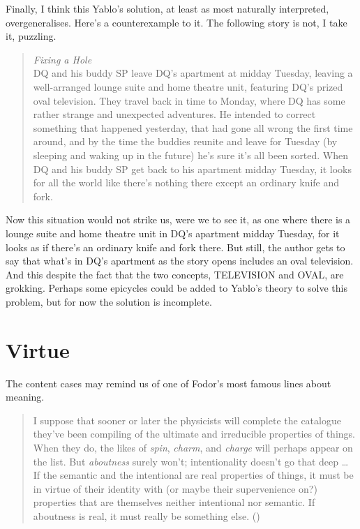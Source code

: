 \documentclass[
  10pt,
  letterpaper,
  DIV=11,
  numbers=noendperiod,
  twoside]{scrartcl}
\begin{document}
Finally, I think this Yablo's solution, at least as most naturally
interpreted, overgeneralises. Here's a counterexample to it. The
following story is not, I take it, puzzling.

\begin{quote}
\emph{Fixing a Hole}\\
DQ and his buddy SP leave DQ's apartment at midday Tuesday, leaving a
well-arranged lounge suite and home theatre unit, featuring DQ's prized
oval television. They travel back in time to Monday, where DQ has some
rather strange and unexpected adventures. He intended to correct
something that happened yesterday, that had gone all wrong the first
time around, and by the time the buddies reunite and leave for Tuesday
(by sleeping and waking up in the future) he's sure it's all been
sorted. When DQ and his buddy SP get back to his apartment midday
Tuesday, it looks for all the world like there's nothing there except an
ordinary knife and fork.
\end{quote}

Now this situation would not strike us, were we to see it, as one where
there is a lounge suite and home theatre unit in DQ's apartment midday
Tuesday, for it looks as if there's an ordinary knife and fork there.
But still, the author gets to say that what's in DQ's apartment as the
story opens includes an oval television. And this despite the fact that
the two concepts, TELEVISION and OVAL, are grokking. Perhaps some
epicycles could be added to Yablo's theory to solve this problem, but
for now the solution is incomplete.

\section{Virtue}\label{virtue}

The content cases may remind us of one of Fodor's most famous lines
about meaning.

\begin{quote}
I suppose that sooner or later the physicists will complete the
catalogue they've been compiling of the ultimate and irreducible
properties of things. When they do, the likes of \emph{spin},
\emph{charm}, and \emph{charge} will perhaps appear on the list. But
\emph{aboutness} surely won't; intentionality doesn't go that deep
\ldots{} If the semantic and the intentional are real properties of
things, it must be in virtue of their identity with (or maybe their
supervenience on?) properties that are themselves neither intentional
nor semantic. If aboutness is real, it must really be something else.
()
\end{quote}
\end{document}
